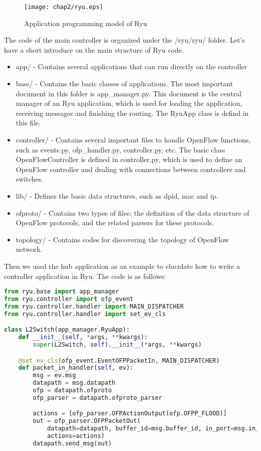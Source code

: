 \begin{figure}[htbp]
  \centering
  \texttt{[image: chap2/ryu.eps]}
  \caption{Application programming model of Ryu}\label{ryueps}
\end{figure}

The code of the main controller is organized under the /ryu/ryu/ folder. Let's have a short introduce on the main structure of Ryu code.

\begin{itemize}
\item app/ - Contains several applications that can run directly on the controller
\item base/ - Contains the basic classes of applications. The most important document in this folder is app\_manager.py. This document is the central manager of an Ryu application, which is used for loading the application, receiving messages and finishing the routing. The RyuApp class is defind in this file.
\item controller/ - Contains several important files to handle OpenFlow functions, such as events.py, ofp\_handler.py, controller.py, etc. The basic class OpenFlowController is defined in controller.py, which is used to define an OpenFlow controller and dealing with connections between controllers and switches.
\item lib/ - Defines the basic data structures, such as dpid, mac and ip.
\item ofproto/ - Contains two types of files: the definition of the data structure of OpenFlow protocols, and the related parsers for these protocols. 
\item topology/ - Contains codes for discovering the topology of OpenFlow network.
\end{itemize}

Then we used the hub application as an example to elucidate how to write a controller application in Ryu. The code is as follows:

\begin{lstlisting}[language={python}, caption={hub.py written by Ryu}]
from ryu.base import app_manager
from ryu.controller import ofp_event
from ryu.controller.handler import MAIN_DISPATCHER
from ryu.controller.handler import set_ev_cls

class L2Switch(app_manager.RyuApp):
    def __init__(self, *args, **kwargs):
        super(L2Switch, self).__init__(*args, **kwargs)

    @set_ev_cls(ofp_event.EventOFPPacketIn, MAIN_DISPATCHER)
    def packet_in_handler(self, ev):
        msg = ev.msg
        datapath = msg.datapath
        ofp = datapath.ofproto
        ofp_parser = datapath.ofproto_parser

        actions = [ofp_parser.OFPActionOutput(ofp.OFPP_FLOOD)]
        out = ofp_parser.OFPPacketOut(
            datapath=datapath, buffer_id=msg.buffer_id, in_port=msg.in_port,
            actions=actions)
        datapath.send_msg(out)
\end{lstlisting}

